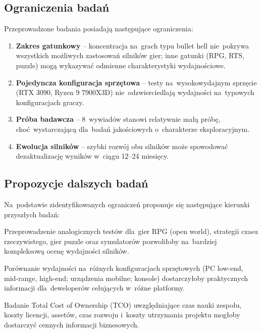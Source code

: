 \subsection{Ograniczenia badań}

Przeprowadzone badania posiadają następujące ograniczenia:

\begin{enumerate}
    \item \textbf{Zakres gatunkowy} -- koncentracja na~grach typu bullet hell 
    nie~pokrywa 
    wszystkich możliwych zastosowań silników gier; inne gatunki (RPG, RTS, puzzle) 
    mogą wykazywać odmienne charakterystyki wydajnościowe.


    \item \textbf{Pojedyncza konfiguracja sprzętowa} -- testy na~wysokowydajnym sprzęcie (RTX 3090, Ryzen 9 7900X3D) nie~odzwierciedlają wydajności na~typowych konfiguracjach graczy.

    \item \textbf{Próba badawcza} -- 8~wywiadów stanowi relatywnie małą próbę, choć~wystarczającą dla~badań jakościowych o~charakterze eksploracyjnym.

    \item \textbf{Ewolucja silników} -- szybki rozwój obu silników może spowodować dezaktualizację wyników w~ciągu 12--24 miesięcy.
\end{enumerate}

\subsection{Propozycje dalszych badań}

Na~podstawie zidentyfikowanych ograniczeń proponuje się następujące kierunki przyszłych badań:

Przeprowadzenie analogicznych testów 
dla~gier RPG (open world), strategii czasu rzeczywistego, gier puzzle oraz symulatorów 
pozwoliłoby na~bardziej kompleksową ocenę wydajności silników.

Porównanie wydajności na~różnych konfiguracjach sprzętowych 
(PC low-end, \\ mid-range, high-end; urządzenia mobilne; konsole) dostarczyłoby 
praktycznych informacji dla~deweloperów celujących w~różne platformy.

Badanie Total Cost of Ownership (TCO) uwzględniające czas nauki zespołu, 
koszty licencji, assetów, czas rozwoju i~koszty utrzymania projektu mogłoby 
dostarczyć cennych informacji biznesowych.

